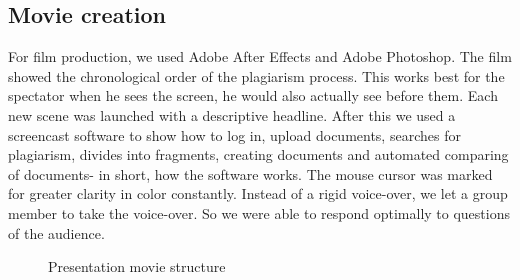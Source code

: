\subsection{Movie creation}
For film production, we used Adobe After Effects and Adobe Photoshop. The film showed the chronological order of the plagiarism process. This works best for the spectator when he sees the screen, he would also actually see before them. Each new scene was launched with a descriptive headline. After this we used a screencast software to show how to log in, upload documents, searches for plagiarism, divides into fragments, creating documents and automated comparing of documents- in short, how the software works. The mouse cursor was marked for greater clarity in color constantly. Instead of a rigid voice-over, we let a group member to take the voice-over. So we were able to respond optimally to questions of the audience.


\begin{figure}[!hbtp]
  \centering
  \caption{Presentation movie structure}
  \label{fig:fpresentation-movie-structure}
\end{figure}

